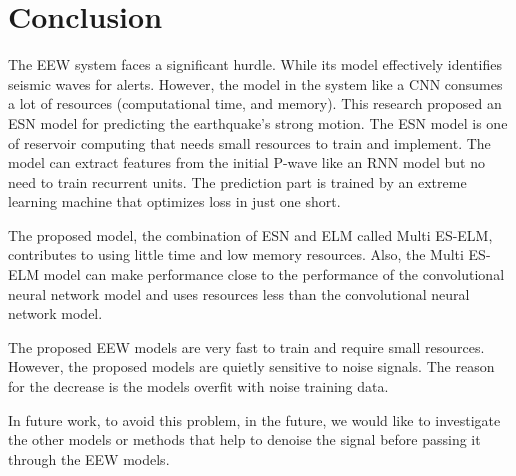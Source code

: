 \section{Conclusion}

The EEW system faces a significant hurdle. While its model effectively identifies seismic waves for alerts. However, the model in the system like a CNN consumes a lot of resources (computational time, and memory).
This research proposed an ESN model for predicting the earthquake's strong motion. The ESN model is one of reservoir computing that needs small resources to train and implement. The model can extract features from the initial P-wave like an RNN model but no need to train recurrent units. The prediction part is trained by an extreme learning machine that optimizes loss in just one short. 

The proposed model, the combination of ESN and ELM called Multi ES-ELM, contributes to using little time and low memory resources. Also, the Multi ES-ELM model can make performance close to the performance of the convolutional neural network model and uses resources less than the convolutional neural network model.

The proposed EEW models are very fast to train and require small resources. However, the proposed models are quietly sensitive to noise signals. The reason for the decrease is the models overfit with noise training data. 

In future work, to avoid this problem, in the future, we would like to investigate the other models or methods that help to denoise the signal before passing it through the EEW models.
